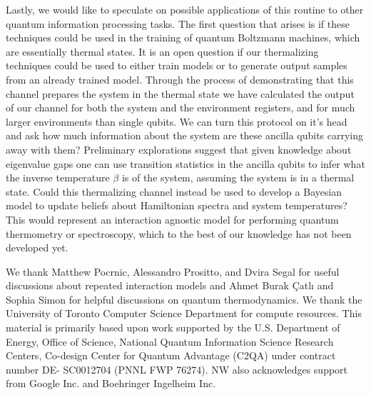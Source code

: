 Lastly, we would like to speculate on possible applications of this routine to other quantum information processing tasks. The first question that arises is if these techniques could be used in the training of quantum Boltzmann machines, which are essentially thermal states. It is an open question if our thermalizing techniques could be used to either train models or to generate output samples from an already trained model. Through the process of demonstrating that this channel prepares the system in the thermal state we have calculated the output of our channel for both the system and the environment registers, and for much larger environments than single qubits. We can turn this protocol on it's head and ask how much information about the system are these ancilla qubits carrying away with them? Preliminary explorations suggest that given knowledge about eigenvalue gaps one can use transition statistics in the ancilla qubits to infer what the inverse temperature $\beta$ is of the system, assuming the system is in a thermal state. Could this thermalizing channel instead be used to develop a Bayesian model to update beliefs about Hamiltonian spectra and system temperatures? This would represent an interaction agnostic model for performing quantum thermometry or spectroscopy, which to the best of our knowledge has not been developed yet. 

We thank Matthew Pocrnic, Alessandro Prositto, and Dvira Segal for useful discussions about repeated interaction models and Ahmet Burak Çatlı and Sophia Simon for helpful discussions on quantum thermodynamics. We thank the University of Toronto Computer Science Department for compute resources. This material is primarily based upon work supported by the U.S. Department of Energy, Office of Science, National Quantum Information Science Research Centers, Co-design Center for Quantum Advantage (C2QA) under contract number DE- SC0012704 (PNNL FWP 76274).  NW also acknowledges support from Google Inc. and Boehringer Ingelheim Inc.
% 
% 

 
